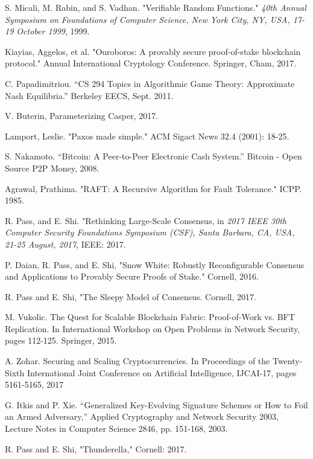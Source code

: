 \documentclass[10pt,journal,compsoc]{IEEEtran}
\begin{document}
\begin{thebibliography}{1}
 S. Micali, M. Rabin, and S. Vadhan. "Verifiable Random Functions." \emph{40th Annual Symposium on Foundations of Computer Science, New York City, NY, USA, 17-19 October 1999}, 1999. 

 Kiayias, Aggelos, et al. "Ouroboros: A provably secure proof-of-stake blockchain protocol." Annual International Cryptology Conference. Springer, Cham, 2017.


 C. Papadimitriou. “CS 294 Topics in Algorithmic Game Theory: Approximate Nash Equilibria.” Berkeley EECS, Sept. 2011.

 V. Buterin, Parameterizing Casper, 2017.

Lamport, Leslie. "Paxos made simple." ACM Sigact News 32.4 (2001): 18-25.


 S. Nakamoto. “Bitcoin: A Peer-to-Peer Electronic Cash System.” Bitcoin - Open Source P2P Money, 2008.

Agrawal, Prathima. "RAFT: A Recursive Algorithm for Fault Tolerance." ICPP. 1985.

 R. Pass, and E. Shi. "Rethinking Large-Scale Consensus, in \emph{2017 IEEE 30th Computer Security Foundations Symposium (CSF), Santa Barbara, CA, USA, 21-25 August, 2017}, IEEE: 2017.

 P. Daian, R. Pass, and E. Shi, "Snow White: Robustly Reconfigurable Consensus and Applications to Provably Secure Proofs of Stake." Cornell, 2016.

 R. Pass and E. Shi, "The Sleepy Model of Consensus. Cornell, 2017.

 M. Vukolic. The Quest for Scalable Blockchain Fabric: Proof-of-Work vs. BFT Replication. In International Workshop on Open Problems in Network Security, pages 112-125. Springer, 2015.

 A. Zohar. Securing and Scaling Cryptocurrencies. In Proceedings of the Twenty-Sixth International Joint Conference on Artificial Intelligence, IJCAI-17, pages 5161-5165, 2017

 G. Itkis and P. Xie. “Generalized Key-Evolving Signature Schemes or How to Foil an Armed Adversary,” Applied Cryptography and Network Security 2003, Lecture Notes in Computer Science 2846, pp. 151-168, 2003.

 R. Pass and E. Shi, "Thunderella," Cornell: 2017.


\end{thebibliography}
\end{document}
